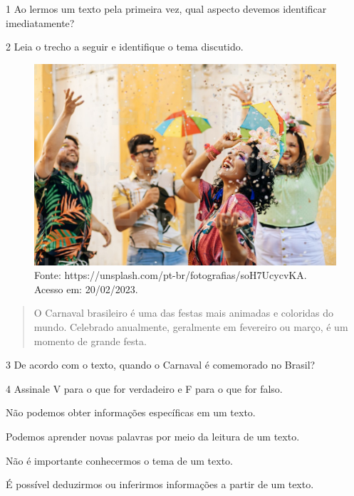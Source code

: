 
\num{1}  Ao lermos um texto pela primeira vez, qual aspecto devemos identificar imediatamente?



\num{2} Leia o trecho a seguir e identifique o tema discutido.

\begin{figure}[htpb!]
\includegraphics[width=.5\textwidth]{./imgs/img2.jpg}
\caption{Fonte: https://unsplash.com/pt-br/fotografias/soH7UcycvKA. Acesso em: 20/02/2023.}
\end{figure}

\begin{quote}
O Carnaval brasileiro é uma das festas mais animadas e coloridas do
mundo. Celebrado anualmente, geralmente em fevereiro ou março, é um
momento de grande festa.
\end{quote}



\num{3} De acordo com o texto, quando o Carnaval é comemorado no Brasil?



\num{4} Assinale V para o que for verdadeiro e F para o que for falso.

\begin{boxlist}
\item Não podemos obter informações específicas em um texto. 

\item Podemos aprender novas palavras por meio da leitura de um texto. 

\item Não é importante conhecermos o tema de um texto. 

\item É possível deduzirmos ou inferirmos informações a partir de um texto. 
\end{boxlist}

